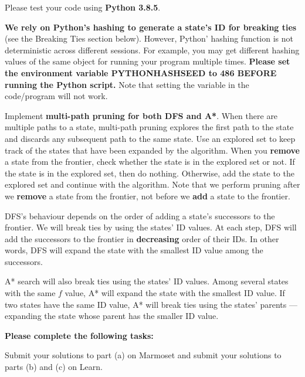\documentclass[12pt]{article}
\begin{document}
Please test your code using {\bf Python 3.8.5}. 

{\bf We rely on Python's hashing to generate a state's ID for breaking ties} (see the Breaking Ties section below). However, Python' hashing function is not deterministic across different sessions. For example, you may get different hashing values of the same object for running your program multiple times. {\bf Please set the environment variable PYTHONHASHSEED to 486 BEFORE running the Python script.} Note that setting the variable in the code/program will not work.

Implement {\bf multi-path pruning for both DFS and A*}. When there are multiple paths to a state, multi-path pruning explores the first path to the state and discards any subsequent path to the same state. Use an explored set to keep track of the states that have been expanded by the algorithm. When you {\bf remove} a state from the frontier, check whether the state is in the explored set or not. If the state is in the explored set, then do nothing. Otherwise, add the state to the explored set and continue with the algorithm. Note that we perform pruning after we {\bf remove} a state from the frontier, not before we {\bf add} a state to the frontier.

DFS's behaviour depends on the order of adding a state's successors to the frontier. We will break ties by using the states' ID values. At each step, DFS will add the successors to the frontier in {\bf decreasing} order of their IDs. In other words, DFS will expand the state with the smallest ID value among the successors.

A* search will also break ties using the states' ID values. Among several states with the same $f$ value, A* will expand the state with the smallest ID value. If two states have the same ID value, A* will break ties using the states' parents --- expanding the state whose parent has the smaller ID value.

{\bf Please complete the following tasks:}

Submit your solutions to part (a) on Marmoset and submit your solutions to parts (b) and (c) on Learn.
\end{document}

